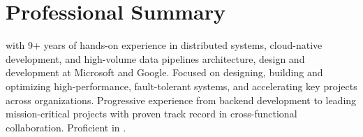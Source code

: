 \section{Professional Summary}
\small{\POSITION{} with 9+ years of hands-on experience in distributed systems, cloud-native development, and
    high-volume data pipelines architecture, design and development at Microsoft and Google.
    Focused on designing, building and optimizing high-performance, fault-tolerant systems, and
    accelerating key projects across organizations. Progressive experience from backend development
    to leading mission-critical projects with proven track record in cross-functional collaboration.
    Proficient in \LanguagesOrder\MainTechnologies.}
